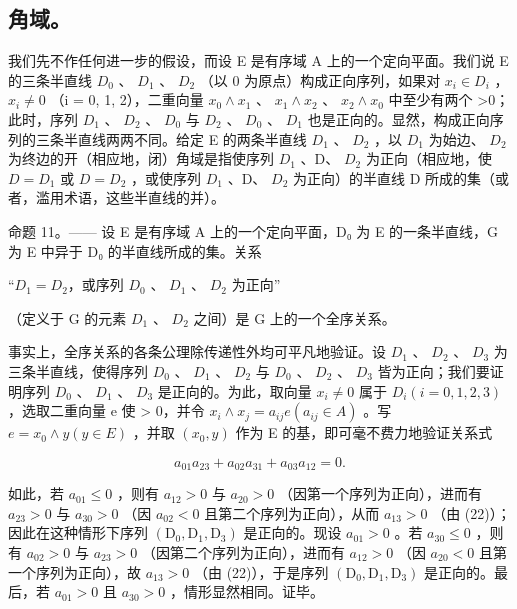 \subsection{角域。}

我们先不作任何进一步的假设，而设 E 是有序域 A 上的一个定向平面。我们说 E 的三条半直线 \(D_{0}\) 、 \(D_{1}\) 、 \(D_{2}\) （以 0 为原点）构成正向序列，如果对 \(x_{i} \in D_{i}\) ， \(x_{i} \neq 0\) （i = 0, 1, 2），二重向量 \(x_{0} \wedge x_{1}\) 、 \(x_{1} \wedge x_{2}\) 、 \(x_{2} \wedge x_{0}\) 中至少有两个 \textgreater0；此时，序列 \(D_{1}\) 、 \(D_{2}\) 、 \(D_{0}\) 与 \(D_{2}\) 、 \(D_{0}\) 、 \(D_{1}\) 也是正向的。显然，构成正向序列的三条半直线两两不同。给定 E 的两条半直线 \(D_{1}\) 、 \(D_{2}\) ，以 \(D_{1}\) 为始边、 \(D_{2}\) 为终边的开（相应地，闭）角域是指使序列 \(D_{1}\) 、D、 \(D_{2}\) 为正向（相应地，使 \(D = D_{1}\) 或 \(D = D_{2}\) ，或使序列 \(D_{1}\) 、D、 \(D_{2}\) 为正向）的半直线 D 所成的集（或者，滥用术语，这些半直线的并）。

命题 11。—— 设 E 是有序域 A 上的一个定向平面，D₀ 为 E 的一条半直线，G 为 E 中异于 D₀ 的半直线所成的集。关系

“\(D_{1} = D_{2}\)，或序列 \(D_{0}\) 、 \(D_{1}\) 、 \(D_{2}\) 为正向”

（定义于 G 的元素 \(D_{1}\) 、 \(D_{2}\) 之间）是 G 上的一个全序关系。

事实上，全序关系的各条公理除传递性外均可平凡地验证。设 \(D_{1}\) 、 \(D_{2}\) 、 \(D_{3}\) 为三条半直线，使得序列 \(D_{0}\) 、 \(D_{1}\) 、 \(D_{2}\) 与 \(D_{0}\) 、 \(D_{2}\) 、 \(D_{3}\) 皆为正向；我们要证明序列 \(D_{0}\) 、 \(D_{1}\) 、 \(D_{3}\) 是正向的。为此，取向量 \(x_{i} \neq 0\) 属于 \(D_{i} (i = 0, 1, 2, 3)\) ，选取二重向量 e 使 \textgreater{} 0，并令 \(x_{i} \wedge x_{j} = a_{ij} e (a_{ij} \in A)\) 。写 \(e = x_{0} \wedge y (y \in E)\) ，并取 \((x_{0}, y)\) 作为 E 的基，即可毫不费力地验证关系式

\[
a _ {0 1} a _ {2 3} + a _ {0 2} a _ {3 1} + a _ {0 3} a _ {1 2} = 0.\tag{22}
\]

如此，若 \(a_{01} \leqslant 0\) ，则有 \(a_{12} > 0\) 与 \(a_{20} > 0\) （因第一个序列为正向），进而有 \(a_{23} > 0\) 与 \(a_{30} > 0\) （因 \(a_{02} < 0\) 且第二个序列为正向），从而 \(a_{13} > 0\) （由 (22)）；因此在这种情形下序列 \((\mathrm{D}_0, \mathrm{D}_1, \mathrm{D}_3)\) 是正向的。现设 \(a_{01} > 0\) 。若 \(a_{30} \leqslant 0\) ，则有 \(a_{02} > 0\) 与 \(a_{23} > 0\) （因第二个序列为正向），进而有 \(a_{12} > 0\) （因 \(a_{20} < 0\) 且第一个序列为正向），故 \(a_{13}>0\) （由 (22)），于是序列 \((\mathrm{D}_{0}, \mathrm{D}_{1}, \mathrm{D}_{3})\) 是正向的。最后，若 \(a_{01}>0\) 且 \(a_{30}>0\) ，情形显然相同。证毕。

